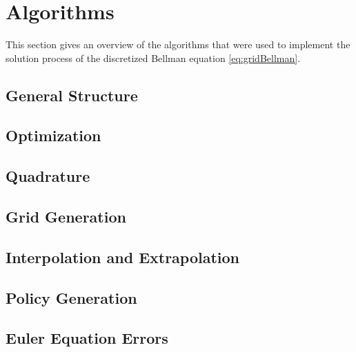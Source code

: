 \section{Algorithms}
\label{sec:82algorithms}

This section gives an overview of the algorithms that
were used to implement the solution process of
the discretized Bellman equation \eqref{eq:gridBellman}.



\subsection{General Structure}

\blindtext{}



\subsection{Optimization}


\blindtext{}



\subsection{Quadrature}

\blindtext{}



\subsection{Grid Generation}

\blindtext{}



\subsection{Interpolation and Extrapolation}


\blindtext{}



\subsection{Policy Generation}

\blindtext{}



\subsection{Euler Equation Errors}

\blindtext{}
